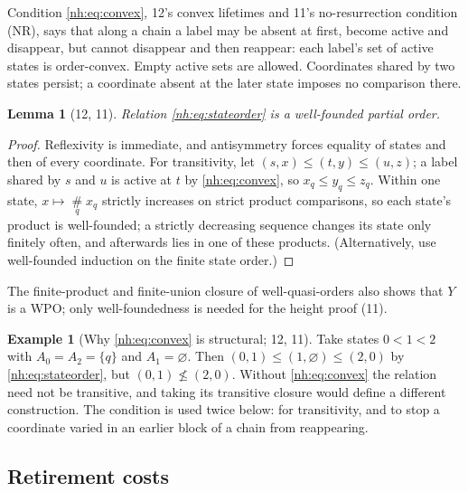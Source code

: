 \documentclass[11pt,a4paper]{article}
\newtheorem{lemma}[theorem]{Lemma}
\theoremstyle{definition}
\newtheorem{example}[theorem]{Example}
\theoremstyle{remark}
\newcommand{\bigns}{\mathop{\#}\limits}
\begin{document}
Condition \eqref{nh:eq:convex}, 12's convex lifetimes and 11's
no-resurrection condition (NR), says that along a chain a label may be absent
at first, become active and disappear, but cannot disappear and then
reappear: each label's set of active states is order-convex. Empty active
sets are allowed. Coordinates shared by two states persist; a coordinate
absent at the later state imposes no comparison there.

\begin{lemma}[12, 11]\label{nh:lem:order}
Relation \eqref{nh:eq:stateorder} is a well-founded partial order.
\end{lemma}
\begin{proof}
Reflexivity is immediate, and antisymmetry forces equality of states and
then of every coordinate. For transitivity, let $(s,x)\le(t,y)\le(u,z)$; a
label shared by $s$ and $u$ is active at $t$ by \eqref{nh:eq:convex}, so
$x_q\le y_q\le z_q$. Within one state, $x\mapsto\bigns_q x_q$ strictly
increases on strict product comparisons, so each state's product is
well-founded; a strictly decreasing sequence changes its state only finitely
often, and afterwards lies in one of these products. (Alternatively, use
well-founded induction on the finite state order.)
\end{proof}

The finite-product and finite-union closure of well-quasi-orders also shows
that $Y$ is a WPO; only well-foundedness is needed for the height proof (11).

\begin{example}[Why \eqref{nh:eq:convex} is structural; 12, 11]\label{nh:ex:noreturn}
Take states $0<1<2$ with $A_0=A_2=\{q\}$ and $A_1=\varnothing$. Then
$(0,1)\le(1,\varnothing)\le(2,0)$ by \eqref{nh:eq:stateorder}, but
$(0,1)\not\le(2,0)$. Without \eqref{nh:eq:convex} the relation need not
be transitive, and taking its transitive closure would define a different
construction. The condition is used twice below: for transitivity, and to
stop a coordinate varied in an earlier block of a chain from reappearing.
\end{example}

\subsection{Retirement costs}
\end{document}
